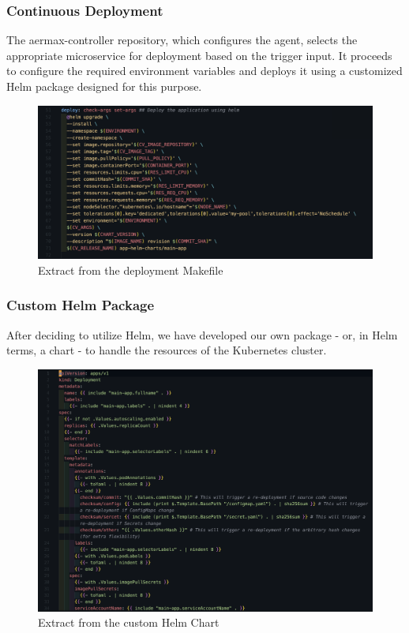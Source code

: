 \subsubsection{Continuous Deployment}
The aermax-controller repository, which configures the agent, selects the appropriate microservice for deployment based on the trigger input. It proceeds to configure the required environment variables and deploys it using a customized Helm package designed for this purpose.


\begin{figure}[H]
  \centering
  \includegraphics[width=1\textwidth]{src/assets/chapters/cd.png}
  \caption{Extract from the deployment Makefile}
  \label{fig:cd-pipeline}
\end{figure}


\subsubsection{Custom Helm Package}
After deciding to utilize Helm, we have developed our own package - or, in Helm terms, a chart - to handle the resources of the Kubernetes cluster.


\begin{figure}[H]
  \centering
  \includegraphics[width=1\textwidth]{src/assets/chapters/customhelm.png}
  \caption{Extract from the custom Helm Chart}
  \label{fig:custom-helm}
\end{figure}

